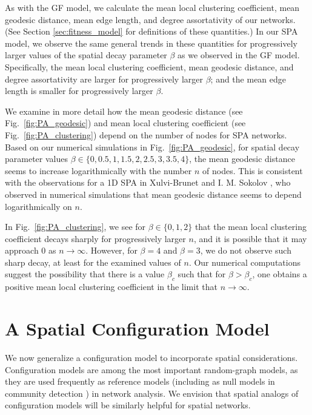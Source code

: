 \documentclass[%
 reprint,
 amsmath,amssymb,
 aps,
]{revtex4-1}
\begin{document}
As with the GF model, we calculate the mean local clustering coefficient, mean geodesic distance, mean edge length, and degree assortativity of our networks. 
(See Section \ref{sec:fitness_model} for definitions of these quantities.) In our SPA model, we observe the same general trends in these quantities for progressively larger values of the spatial decay parameter $\beta$ as we observed in the GF model. Specifically, the mean local clustering coefficient, mean geodesic distance, and degree assortativity are larger for progressively larger $\beta$; and the mean edge length is smaller for progressively larger $\beta$.

We examine in more detail how the mean geodesic distance (see Fig.~\ref{fig:PA_geodesic}) and mean local clustering coefficient (see Fig.~\ref{fig:PA_clustering}) depend on the number of nodes for SPA networks. Based on our numerical simulations in Fig.~\ref{fig:PA_geodesic}, for spatial decay parameter values $\beta \in \{ 0, 0.5, 1, 1.5, 2, 2.5, 3, 3.5, 4\}$, the mean geodesic distance seems to increase logarithmically with the number $n$ of nodes. This is consistent with the observations for a 1D SPA in Xulvi-Brunet and I. M. Sokolov \cite{SPA1}, who observed in numerical simulations that mean geodesic distance seems to depend logarithmically on $n$.

In Fig.~\ref{fig:PA_clustering}, we see for $\beta \in \{0,1,2\}$ that the mean local clustering coefficient decays sharply for progressively larger $n$, and it is possible that it may approach $0$ as $n \rightarrow\infty$. However, for $\beta=4$ and $\beta=3$, we do not observe such sharp decay, at least for the examined values of $n$. Our numerical computations suggest the possibility that there is a value $\beta_c$ such that for $\beta > \beta_c$, one obtains a positive mean local clustering coefficient in the limit that $n \rightarrow \infty$.




\section{A Spatial Configuration Model} \label{sec:configuration_model}

We now generalize a configuration model \cite{fosdick, newman2018} to incorporate spatial considerations. Configuration models are among the most important random-graph models, as they are used frequently as reference models (including as null models in community detection \cite{community1, community2}) in network analysis. We envision that spatial analogs of configuration models will be similarly helpful for spatial networks.
\end{document}

